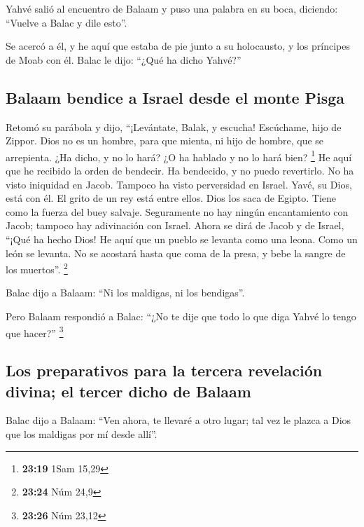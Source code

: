 \begin{paracol}{2}
 Yahvé salió al encuentro de Balaam y puso una palabra en
su boca, diciendo: ``Vuelve a Balac y dile esto''.

 Se acercó a él, y he aquí que estaba de pie junto a su
holocausto, y los príncipes de Moab con él. Balac le dijo: ``¿Qué ha
dicho Yahvé?''

\hypertarget{balaam-bendice-a-israel-desde-el-monte-pisga}{%
\subsection{Balaam bendice a Israel desde el monte
Pisga}\label{balaam-bendice-a-israel-desde-el-monte-pisga}}

 Retomó su parábola y dijo, ``¡Levántate, Balak, y
escucha! Escúchame, hijo de Zippor.  Dios no es un
hombre, para que mienta, ni hijo de hombre, que se arrepienta. ¿Ha
dicho, y no lo hará? ¿O ha hablado y no lo hará bien? \footnote{\textbf{23:19}
  1Sam 15,29}  He aquí que he recibido la orden de
bendecir. Ha bendecido, y no puedo revertirlo.  No ha
visto iniquidad en Jacob. Tampoco ha visto perversidad en Israel. Yavé,
su Dios, está con él. El grito de un rey está entre ellos.
 Dios los saca de Egipto. Tiene como la fuerza del buey
salvaje.  Seguramente no hay ningún encantamiento con
Jacob; tampoco hay adivinación con Israel. Ahora se dirá de Jacob y de
Israel, ``¡Qué ha hecho Dios!  He aquí que un pueblo se
levanta como una leona. Como un león se levanta. No se acostará hasta
que coma de la presa, y bebe la sangre de los muertos''. \footnote{\textbf{23:24}
  Núm 24,9}

 Balac dijo a Balaam: ``Ni los maldigas, ni los
bendigas''.

 Pero Balaam respondió a Balac: ``¿No te dije que todo lo
que diga Yahvé lo tengo que hacer?'' \footnote{\textbf{23:26} Núm 23,12}

\hypertarget{los-preparativos-para-la-tercera-revelaciuxf3n-divina-el-tercer-dicho-de-balaam}{%
\subsection{Los preparativos para la tercera revelación divina; el
tercer dicho de
Balaam}\label{los-preparativos-para-la-tercera-revelaciuxf3n-divina-el-tercer-dicho-de-balaam}}

 Balac dijo a Balaam: ``Ven ahora, te llevaré a otro
lugar; tal vez le plazca a Dios que los maldigas por mí desde allí''.


\end{paracol}
